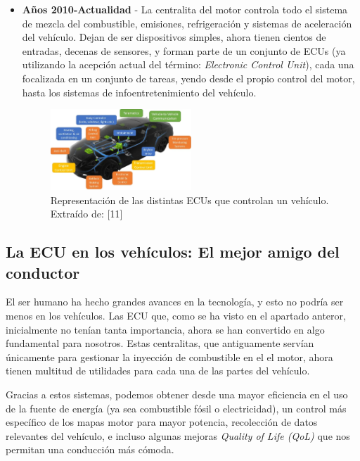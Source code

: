 \begin{itemize}
    \item \textbf{Años 2010-Actualidad} - La centralita del motor controla todo el sistema de mezcla del combustible, emisiones, refrigeración y sistemas de aceleración del vehículo. Dejan de ser dispositivos simples, ahora tienen cientos de entradas, decenas de sensores, y forman parte de un conjunto de ECUs (ya utilizando la acepción actual del término: \textit{Electronic Control Unit}), cada una focalizada en un conjunto de tareas, yendo desde el propio control del motor, hasta los sistemas de infoentretenimiento del vehículo. 
       

    \begin{figure}[h]
        \centering
        \includegraphics[width=0.5\textwidth]{imagenes/ECU_autotechdrive_completa.png}
        \caption{Representación de las distintas ECUs que controlan un vehículo. Extraído de: [11]}
    \end{figure}
              
\end{itemize}



\subsection{La ECU en los vehículos: El mejor amigo del conductor}

El ser humano ha hecho grandes avances en la tecnología, y esto no podría ser menos en los vehículos. Las ECU que, como se ha visto en el apartado anteror, inicialmente no tenían tanta importancia, ahora se han convertido en algo fundamental para nosotros. Estas centralitas, que antiguamente servían únicamente para gestionar la inyección de combustible en el el motor, ahora tienen multitud de utilidades para cada una de las partes del vehículo.

Gracias a estos sistemas, podemos obtener desde una mayor eficiencia en el uso de la fuente de energía (ya sea combustible fósil o electricidad), un control más específico de los mapas motor para mayor potencia, recolección de datos relevantes del vehículo, e incluso algunas mejoras \textit{Quality of Life (QoL)} que nos permitan una conducción más cómoda. 

